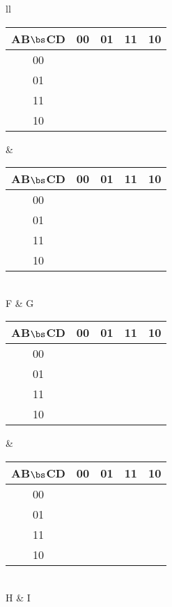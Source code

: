\begin{description}
    \begin{tabular}{ll}
	    \begin{tabular} {c||c|c|c|c}
	       AB$\bs$CD & 00 & 01 & 11 & 10 \\ \hline \hline
	       00        &    &    &    &    \\ \hline
	       01        &    &    &    &    \\ \hline
	       11        &    &    &    &    \\ \hline
	       10        &    &    &    &    \\
	    \end{tabular}		&
	    \begin{tabular} {c||c|c|c|c}
	       AB$\bs$CD & 00 & 01 & 11 & 10 \\ \hline \hline
	       00        &    &    &    &    \\ \hline
	       01        &    &    &    &    \\ \hline
	       11        &    &    &    &    \\ \hline
	       10        &    &    &    &    \\
	    \end{tabular}		\\
	F & G \vspace{0.2in}\\ 
	    \begin{tabular} {c||c|c|c|c}
	       AB$\bs$CD & 00 & 01 & 11 & 10 \\ \hline \hline
	       00        &    &    &    &    \\ \hline
	       01        &    &    &    &    \\ \hline
	       11        &    &    &    &    \\ \hline
	       10        &    &    &    &    \\
	    \end{tabular}		&
	    \begin{tabular} {c||c|c|c|c}
	       AB$\bs$CD & 00 & 01 & 11 & 10 \\ \hline \hline
	       00        &    &    &    &    \\ \hline
	       01        &    &    &    &    \\ \hline
	       11        &    &    &    &    \\ \hline
	       10        &    &    &    &    \\
	    \end{tabular}		\\
	H & I \vspace{0.2in}\\
	\end{tabular}



\end{description}
